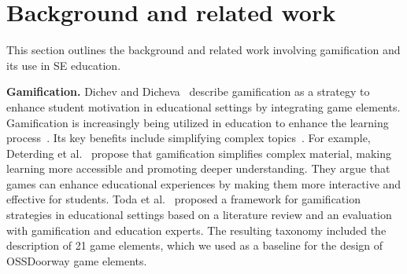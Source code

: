 \section{Background and related work}
\label{sec:backrelated}

This section outlines the background and related work involving gamification and its use in SE education.


\textbf{Gamification.} Dichev and Dicheva~\cite{dichev2017gamifying} describe gamification as a strategy to enhance student motivation in educational settings by integrating game elements. Gamification is increasingly being utilized in education to enhance the learning process~\cite{deterding2011gamification, sailer2020gamification}. Its key benefits include simplifying complex topics~\cite{marin2018empirical, ayub2019gamification}. For example, Deterding et al.~\cite{deterding2011gamification} propose that gamification simplifies complex material, making learning more accessible and promoting deeper understanding. They argue that games can enhance educational experiences by making them more interactive and effective for students. %
Toda et al.~\cite{toda2019analysing} proposed a framework for gamification strategies in educational settings based on a literature review and an evaluation with gamification and education experts. The resulting taxonomy included the description of 21 game elements, which we used as a baseline for the design of OSSDoorway game elements.

